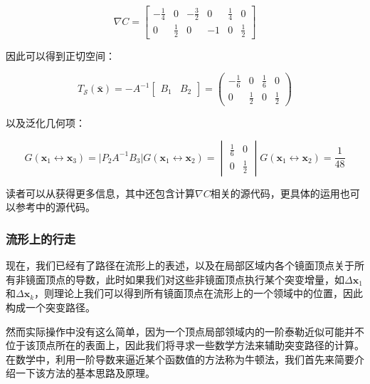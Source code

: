 \begin{equation}
	\nabla C=\begin{bmatrix}
		-\frac{1}{4} & 0           & -\frac{3}{2} & 0  & \frac{1}{4} & 0 \\
		           0 & \frac{1}{2} & 0            & -1 & 0           & \frac{1}{2}
	\end{bmatrix}
\end{equation}

\noindent 因此可以得到正切空间：

\begin{equation}
	T_{\mathcal{S}}(\bar{\mathbf{x}})=-A^{-1}\begin{bmatrix}
		B_1 & B_2
	\end{bmatrix}=\begin{pmatrix}
		-\frac{1}{6} & 0 & \frac{1}{6} & 0\\
		0 & \frac{1}{2} & 0 &\frac{1}{2}
	\end{pmatrix}
\end{equation}

\noindent 以及泛化几何项：

\begin{equation}
	G(\mathbf{x}_1\leftrightarrow\mathbf{x}_3)=\bigg| P_2A^{-1}B_3\bigg|	G(\mathbf{x}_1\leftrightarrow\mathbf{x}_2)=\begin{vmatrix}
		\frac{1}{6} & 0\\
		0 & \frac{1}{2}	
	\end{vmatrix}G(\mathbf{x}_1\leftrightarrow\mathbf{x}_2)=\frac{1}{48}
\end{equation}

读者可以从\cite{a:LIGHTTRANSPORTONPATHSPACEMANIFOLDS,a:ManifoldExplorationExpanded}获得更多信息，其中还包含计算$\nabla C$相关的源代码，更具体的运用也可以参考\cite{m:MitsubaRenderer}中的源代码。





\subsubsection{流形上的行走}\label{sec:mlt-manifold-move}
现在，我们已经有了路径在流形上的表述，以及在局部区域内各个镜面顶点关于所有非镜面顶点的导数，此时如果我们对这些非镜面顶点执行某个突变增量，如$\Delta \mathbf{x}_1$和$\Delta \mathbf{x}_k$，则理论上我们可以得到所有镜面顶点在流形上的一个领域中的位置，因此构成一个突变路径。

然而实际操作中没有这么简单，因为一个顶点局部领域内的一阶泰勒近似可能并不位于该顶点所在的表面上，因此我们将寻求一些数学方法来辅助突变路径的计算。在数学中，利用一阶导数来逼近某个函数值的方法称为牛顿法，我们首先来简要介绍一下该方法的基本思路及原理。



